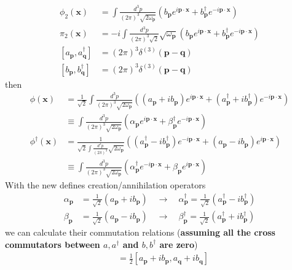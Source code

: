 \documentclass[10pt,a4paper]{book}
\theoremstyle{definition}
\begin{document}
\begin{enumerate}[(a)]
\begin{align}
\phi_2(\mathbf{x})&=\int\frac{d^3p}{(2\pi)^3\sqrt{2\omega_\mathbf{p}}}\left(b_\mathbf{p}e^{i\mathbf{p}\cdot\mathbf{x}}+b^\dagger_\mathbf{p}e^{-i\mathbf{p}\cdot\mathbf{x}}\right)\\
\pi_2(\mathbf{x})&=-i\int\frac{d^3p}{(2\pi)^3\sqrt{2}}\sqrt{\omega_\mathbf{p}}\left(b_\mathbf{p}e^{i\mathbf{p}\cdot\mathbf{x}}+b^\dagger_\mathbf{p}e^{-i\mathbf{p}\cdot\mathbf{x}}\right)\\
[a_\mathbf{p},a^\dagger_\mathbf{q}]&=(2\pi)^3\delta^{(3)}(\mathbf{p}-\mathbf{q})\\
[b_\mathbf{p},b^\dagger_\mathbf{q}]&=(2\pi)^3\delta^{(3)}(\mathbf{p}-\mathbf{q})
\end{align}
then
\begin{align}
\phi(\mathbf{x})&=\frac{1}{\sqrt{2}}\int\frac{d^3p}{(2\pi)^3\sqrt{2\omega_\mathbf{p}}}\left((a_\mathbf{p}+ib_\mathbf{p})e^{i\mathbf{p}\cdot\mathbf{x}}+(a^\dagger_\mathbf{p}+ib^\dagger_\mathbf{p})e^{-i\mathbf{p}\cdot\mathbf{x}}\right)\\
&\equiv\int\frac{d^3p}{(2\pi)^3\sqrt{2\omega_\mathbf{p}}}\left(\alpha_\mathbf{p}e^{i\mathbf{p}\cdot\mathbf{x}}+\beta^\dagger_\mathbf{p} e^{-i\mathbf{p}\cdot\mathbf{x}}\right)\\
\phi^\dagger(\mathbf{x})&=\frac{1}{\sqrt{2}\int\frac{d^3p}{(2\pi)^3}\sqrt{2\omega_\mathbf{p}}}\left((a^\dagger_\mathbf{p}-ib^\dagger_\mathbf{p})e^{-i\mathbf{p}\cdot\mathbf{x}}+(a_\mathbf{p}-ib_\mathbf{p})e^{i\mathbf{p}\cdot\mathbf{x}}\right)\\
&\equiv\int\frac{d^3p}{(2\pi)^3\sqrt{2\omega_\mathbf{p}}}\left(\alpha^\dagger_\mathbf{p}e^{-i\mathbf{p}\cdot\mathbf{x}}+\beta_\mathbf{p}e^{i\mathbf{p}\cdot\mathbf{x}}\right)
\end{align}
With the new defines creation/annihilation operators
\begin{align}
\alpha_\mathbf{p}&=\frac{1}{\sqrt{2}}(a_\mathbf{p}+ib_\mathbf{p})\quad\rightarrow\quad \alpha^\dagger_\mathbf{p}=\frac{1}{\sqrt{2}}(a^\dagger_\mathbf{p}-ib^\dagger_\mathbf{p})\\
\beta_\mathbf{p}&=\frac{1}{\sqrt{2}}(a_\mathbf{p}-ib_\mathbf{p})\quad\rightarrow\quad \beta^\dagger_\mathbf{p}=\frac{1}{\sqrt{2}}(a^\dagger_\mathbf{p}+ib^\dagger_\mathbf{p})
\end{align}
we can calculate their commutation relations ({\bf assuming all the cross commutators between $a,a^\dagger$ and $b, b^\dagger$ are zero})
\begin{align}
[\alpha_\mathbf{p},\alpha_\mathbf{q}]
&=\frac{1}{2}[a_\mathbf{p}+ib_\mathbf{p},a_\mathbf{q}+ib_\mathbf{q}]\\

\end{align}
\end{enumerate}
\end{document}
